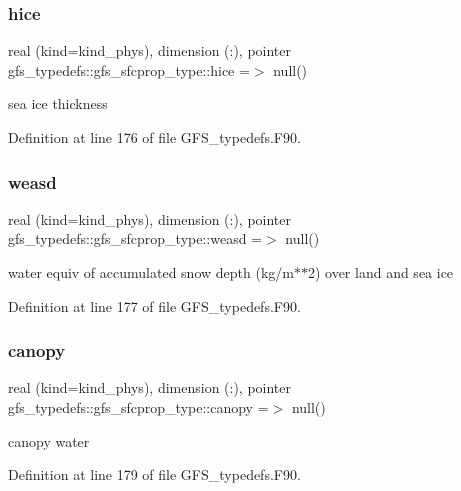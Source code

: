 \subsubsection{hice}
{\footnotesize\ttfamily real (kind=kind\+\_\+phys), dimension   (\+:), pointer gfs\+\_\+typedefs\+::gfs\+\_\+sfcprop\+\_\+type\+::hice =$>$ null()}



sea ice thickness 



Definition at line 176 of file G\+F\+S\+\_\+typedefs.\+F90.

\mbox{\label{structgfs__typedefs_1_1gfs__sfcprop__type_ac53722c4f6550aff7c2aaaced82bd2a0}} 
\subsubsection{weasd}
{\footnotesize\ttfamily real (kind=kind\+\_\+phys), dimension  (\+:), pointer gfs\+\_\+typedefs\+::gfs\+\_\+sfcprop\+\_\+type\+::weasd =$>$ null()}



water equiv of accumulated snow depth (kg/m$\ast$$\ast$2) over land and sea ice 



Definition at line 177 of file G\+F\+S\+\_\+typedefs.\+F90.

\mbox{\label{structgfs__typedefs_1_1gfs__sfcprop__type_adec01ce232c3591c1d6707aaeb2c9d68}} 
\subsubsection{canopy}
{\footnotesize\ttfamily real (kind=kind\+\_\+phys), dimension (\+:), pointer gfs\+\_\+typedefs\+::gfs\+\_\+sfcprop\+\_\+type\+::canopy =$>$ null()}



canopy water 



Definition at line 179 of file G\+F\+S\+\_\+typedefs.\+F90.

\mbox{\label{structgfs__typedefs_1_1gfs__sfcprop__type_a0c7c56b6af986ac2c8885f8d39ba06c9}} 
